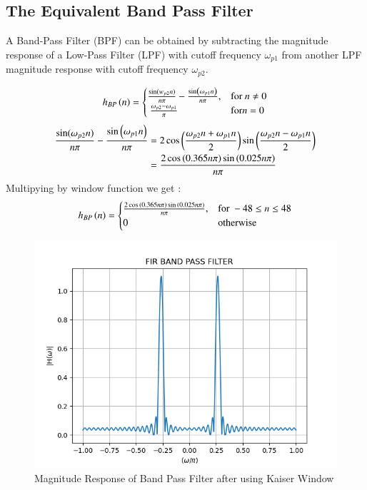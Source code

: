 \documentclass{article}
\begin{document}
\subsection{The Equivalent Band Pass Filter}
A Band-Pass Filter (BPF) can be obtained by subtracting the magnitude response of a Low-Pass Filter (LPF) with cutoff frequency $\omega_{p1}$ from another LPF magnitude response with cutoff frequency $\omega_{p2}$.

\begin{align}
    h_{BP}\left(n\right) = 
\begin{cases} 
    \frac{\sin(w_{p2} n)}{n\pi} -\frac{\sin\left(\omega_{p1}n\right)}{n\pi},  & \text{for } n\neq 0\\\
    \frac{\omega_{p2}-\omega_{p1}}{\pi} &\text{for} n= 0
\end{cases} \label{eq:h(n)desired_for_LPF}
\end{align}
\begin{align}
     \frac{\sin(\omega_{p2} n)}{n\pi} -\frac{\sin\left(\omega_{p1}n\right)}{n\pi} &= 2\cos{\ensuremath{\left(\frac{\omega_{p2}n+\omega_{p1}n}{2}\right)}}\sin{\ensuremath{\left(\frac{\omega_{p2}n-\omega_{p1}n}{2}\right)}}\\
            &= \frac{2\cos{\ensuremath{\left(0.365n\pi\right)}}\sin{\ensuremath{\left(0.025n\pi\right)}}}{n\pi}
\end{align}
Multipying by window function we get :
\begin{align}
    h_{BP}\left(n\right) = 
\begin{cases} 
   \frac{2\cos{\ensuremath{\left(0.365n\pi\right)}}\sin{\ensuremath{\left(0.025n\pi\right)}}}{n\pi},  & \text{for } -48\leq n \leq 48 \\
    0 &\text{otherwise}
\end{cases} \label{eq:h(n)desired_for_LPF}
\end{align}

\begin{figure}[H]
\centering
\includegraphics[width=\columnwidth]{figs/8.png}
\caption{Magnitude Response of Band Pass Filter after using Kaiser Window}
\label{fig:Kaiser_BPF_response}
\end{figure}
\end{document}
